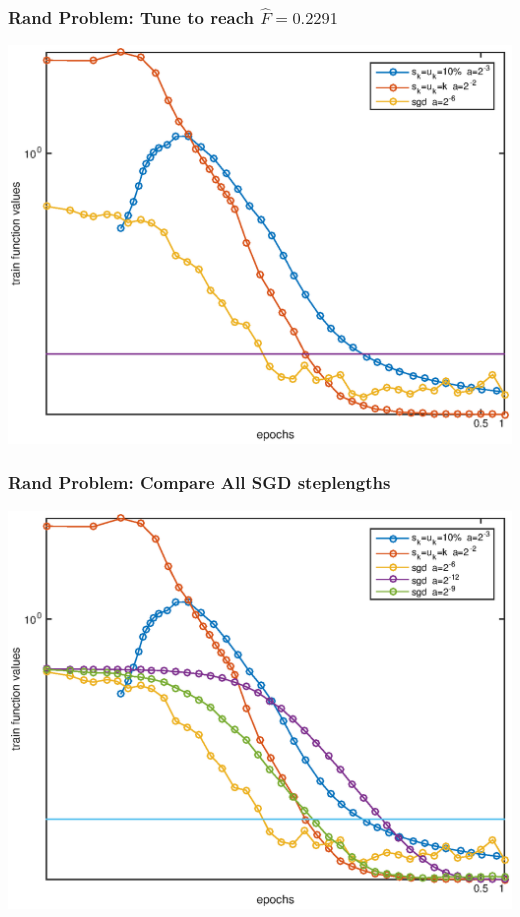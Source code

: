 \documentclass{beamer}
\begin{document}
		\begin{frame}
			\frametitle{Rand Problem: Tune to reach $\hat{F}=0.2291$}
			\begin{center}
					\includegraphics[scale=0.5]{whowins3-1.eps}
			\end{center}
     	\end{frame}
		
		\begin{frame}
			\frametitle{Rand Problem: Compare All SGD steplengths}
			\begin{center}
					\includegraphics[scale=0.5]{whowins4-1.eps}
			\end{center}
     	\end{frame}
		
\end{document}
